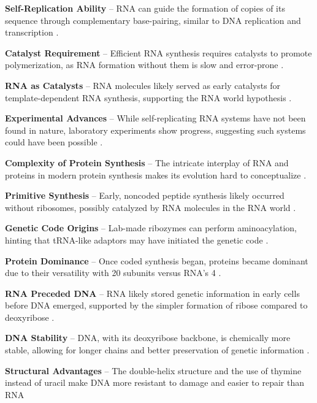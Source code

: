 
\textbf{Self-Replication Ability} – RNA can guide the formation of copies of its sequence through complementary base-pairing, similar to DNA replication and transcription \cite*{L1-Chapter6}.

\textbf{Catalyst Requirement} – Efficient RNA synthesis requires catalysts to promote polymerization, as RNA formation without them is slow and error-prone \cite*{L1-Chapter6}.

\textbf{RNA as Catalysts} – RNA molecules likely served as early catalysts for template-dependent RNA synthesis, supporting the RNA world hypothesis \cite*{L1-Chapter6}.

\textbf{Experimental Advances} – While self-replicating RNA systems have not been found in nature, laboratory experiments show progress, suggesting such systems could have been possible \cite*{L1-Chapter6}.



\textbf{Complexity of Protein Synthesis} – The intricate interplay of RNA and proteins in modern protein synthesis makes its evolution hard to conceptualize \cite*{L1-Chapter6}.

\textbf{Primitive Synthesis} – Early, noncoded peptide synthesis likely occurred without ribosomes, possibly catalyzed by RNA molecules in the RNA world \cite*{L1-Chapter6}.

\textbf{Genetic Code Origins} – Lab-made ribozymes can perform aminoacylation, hinting that tRNA-like adaptors may have initiated the genetic code \cite*{L1-Chapter6}.

\textbf{Protein Dominance} – Once coded synthesis began, proteins became dominant due to their versatility with 20 subunits versus RNA’s 4 \cite*{L1-Chapter6}.


\textbf{RNA Preceded DNA} – RNA likely stored genetic information in early cells before DNA emerged, supported by the simpler formation of ribose compared to deoxyribose \cite*{L1-Chapter6}.

\textbf{DNA Stability} – DNA, with its deoxyribose backbone, is chemically more stable, allowing for longer chains and better preservation of genetic information \cite*{L1-Chapter6}.

\textbf{Structural Advantages} – The double-helix structure and the use of thymine instead of uracil make DNA more resistant to damage and easier to repair than RNA \cite*{L1-Chapter6}

